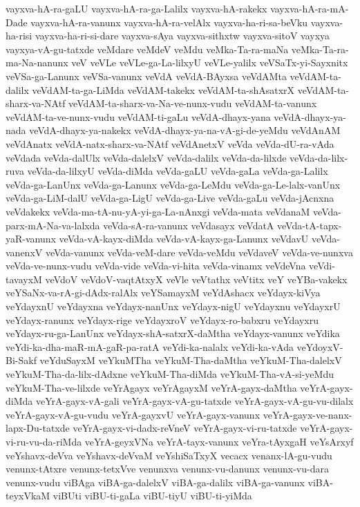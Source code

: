 {vayxva-hA-ra-gaLU
vayxva-hA-ra-ga-Lalilx
vayxva-hA-rakekx
vayxva-hA-ra-mA-Dade
vayxva-hA-ra-vanunx
vayxva-hA-ra-velAlx
vayxva-ha-ri-sa-beVku
vayxva-ha-risi
vayxva-ha-ri-si-dare
vayxva-sAya
vayxva-sithxtw
vayxva-sitoV
vayxya
vayxya-vA-gu-tatxde
veMdare
veMdeV
veMdu
veMka-Ta-ra-maNa
veMka-Ta-ra-ma-Na-nanunx
veV
veVLe
veVLe-ga-La-lilxyU
veVLe-yalilx
veVSaTx-yi-Sayxnitx
veVSa-ga-Lanunx
veVSa-vanunx
veVdA
veVdA-BAyxsa
veVdAMta
veVdAM-ta-dalilx
veVdAM-ta-ga-LiMda
veVdAM-takekx
veVdAM-ta-shAsatxrX
veVdAM-ta-sharx-va-NAtf
veVdAM-ta-sharx-va-Na-ve-nunx-vudu
veVdAM-ta-vanunx
veVdAM-ta-ve-nunx-vudu
veVdAM-ti-gaLu
veVdA-dhayx-yana
veVdA-dhayx-ya-nada
veVdA-dhayx-ya-nakekx
veVdA-dhayx-ya-na-vA-gi-de-yeMdu
veVdAnAM
veVdAnatx
veVdA-natx-sharx-va-NAtf
veVdAnetxV
veVda
veVda-dU-ra-vAda
veVdada
veVda-dalUlx
veVda-dalelxV
veVda-dalilx
veVda-da-lilxde
veVda-da-lilx-ruva
veVda-da-lilxyU
veVda-diMda
veVda-gaLU
veVda-gaLa
veVda-ga-Lalilx
veVda-ga-LanUnx
veVda-ga-Lanunx
veVda-ga-LeMdu
veVda-ga-Le-lalx-vanUnx
veVda-ga-LiM-dalU
veVda-ga-LigU
veVda-ga-Live
veVda-gaLu
veVda-jAcnxna
veVdakekx
veVda-ma-tA-nu-yA-yi-ga-La-nAnxgi
veVda-mata
veVdanaM
veVda-parx-mA-Na-va-lalxda
veVda-sA-ra-vanunx
veVdasayx
veVdatA
veVda-tA-tapx-yaR-vanunx
veVda-vA-kayx-diMda
veVda-vA-kayx-ga-Lanunx
veVdavU
veVda-vanenxV
veVda-vanunx
veVda-veM-dare
veVda-veMdu
veVdaveV
veVda-ve-nunxva
veVda-ve-nunx-vudu
veVda-vide
veVda-vi-hita
veVda-vinamx
veVdeVna
veVdi-tavayxM
veVdoV
veVdoV-vaqtAtxyX
veVle
veVtathx
veVtitx
veY
veYBa-vakekx
veYSaNx-va-rA-gi-dAdx-ralAlx
veYSamayxM
veYdAshacx
veYdayx-kiVya
veYdayxnU
veYdayxna
veYdayx-nanUnx
veYdayx-nigU
veYdayxnu
veYdayxrU
veYdayx-ranunx
veYdayx-rige
veYdayxroV
veYdayx-ro-babxru
veYdayxru
veYdayx-ru-ga-LanUnx
veYdayx-shA-satxrX-daMtha
veYdayx-vanunx
veYdika
veYdi-ka-dha-maR-mA-gaR-pa-ratA
veYdi-ka-nalalx
veYdi-ka-vAda
veYdoyxV-Bi-Sakf
veYduSayxM
veYkuMTha
veYkuM-Tha-daMtha
veYkuM-Tha-dalelxV
veYkuM-Tha-da-lilx-dAdxne
veYkuM-Tha-diMda
veYkuM-Tha-vA-si-yeMdu
veYkuM-Tha-ve-lilxde
veYrAgayx
veYrAgayxM
veYrA-gayx-daMtha
veYrA-gayx-diMda
veYrA-gayx-vA-gali
veYrA-gayx-vA-gu-tatxde
veYrA-gayx-vA-gu-vu-dilalx
veYrA-gayx-vA-gu-vudu
veYrA-gayxvU
veYrA-gayx-vanunx
veYrA-gayx-ve-nanx-lapx-Du-tatxde
veYrA-gayx-vi-dadx-reVneV
veYrA-gayx-vi-ru-tatxde
veYrA-gayx-vi-ru-vu-da-riMda
veYrA-geyxVNa
veYrA-tayx-vanunx
veYra-tAyxgaH
veYsArxyf
veYshavx-deVva
veYshavx-deVvaM
veYshiSaTxyX
vecacx
venanx-lA-gu-vudu
venunx-tAtxre
venunx-tetxVve
venunxva
venunx-vu-danunx
venunx-vu-dara
venunx-vudu
viBAga
viBA-ga-dalelxV
viBA-ga-dalilx
viBA-ga-vanunx
viBA-teyxVkaM
viBUti
viBU-ti-gaLa
viBU-tiyU
viBU-ti-yiMda
}
